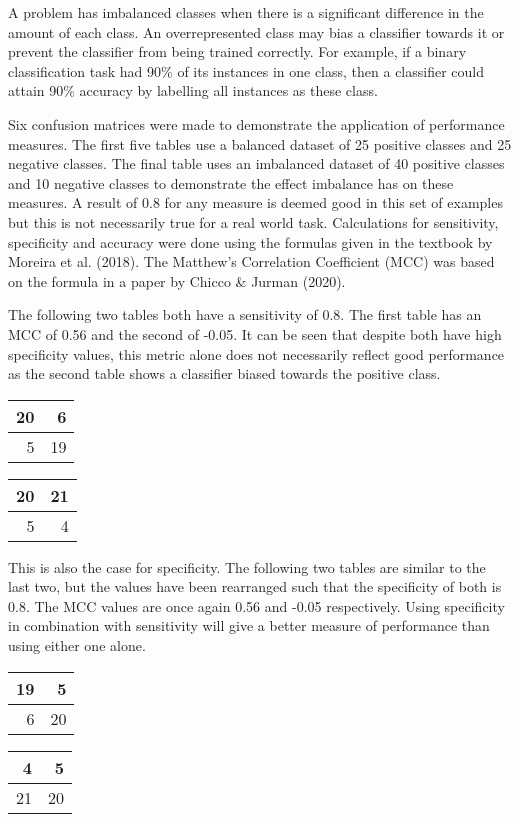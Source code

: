 \documentclass[11pt, a4paper]{article}
\begin{document}
A problem has imbalanced classes when there is a significant difference in the amount of each class. An overrepresented class may bias a classifier towards it or prevent the classifier from being trained correctly. For example, if a binary classification task had 90\% of its instances in one class, then a classifier could attain 90\% accuracy by labelling all instances as these class.

Six confusion matrices were made to demonstrate the application of performance measures. The first five tables use a balanced dataset of 25 positive classes and 25 negative classes. The final table uses an imbalanced dataset of 40 positive classes and 10 negative classes to demonstrate the effect imbalance has on these measures. A result of 0.8 for any measure is deemed good in this set of examples but this is not necessarily true for a real world task. Calculations for sensitivity, specificity and accuracy were done using the formulas given in the textbook by Moreira et al. (2018). The Matthew's Correlation Coefficient (MCC) was based on the formula in a paper by Chicco \& Jurman (2020).

The following two tables both have a sensitivity of 0.8. The first table has an MCC of 0.56 and the second of -0.05. It can be seen that despite both have high specificity values, this metric alone does not necessarily reflect good performance as the second table shows a classifier biased towards the positive class.
\begin{center}
\begin{tabular}{|r|r|}
\hline
20 & 6\\
\hline
5 & 19\\
\hline
\end{tabular}
\qquad
\begin{tabular}{|r|r|}
\hline
20 & 21\\
\hline
5 & 4\\
\hline
\end{tabular}
\end{center}

This is also the case for specificity. The following two tables are similar to the last two, but the values have been rearranged such that the specificity of both is 0.8. The MCC values are once again 0.56 and -0.05 respectively. Using specificity in combination with sensitivity will give a better measure of performance than using either one alone.

\begin{center}
\begin{tabular}{|r|r|}
\hline
19 & 5\\
\hline
6 & 20\\
\hline
\end{tabular}
\qquad
\begin{tabular}{|r|r|}
\hline
4 & 5\\
\hline
21 & 20\\
\hline
\end{tabular}
\end{center}
\end{document}
